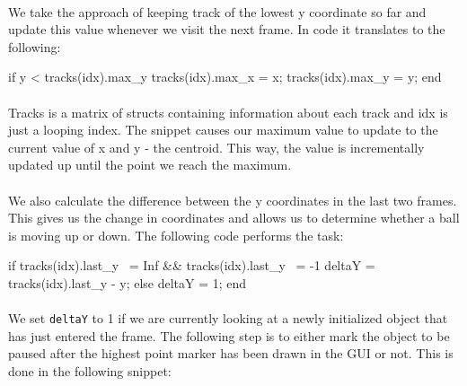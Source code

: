 \documentclass[10pt,a4paper]{article}
\begin{document}
\paragraph{} We take the approach of keeping track of the lowest y coordinate so far and update this value whenever we visit the next frame. In code it translates to the following:

\begin{samepage}
\begin{verbatimtab}
	if y < tracks(idx).max_y
		tracks(idx).max_x = x;
		tracks(idx).max_y = y;
	end
\end{verbatimtab}
\end{samepage}

\paragraph{} Tracks is a matrix of structs containing information about each track and idx is just a looping index. The snippet causes our maximum value to update to the current value of x and y - the centroid. This way, the value is incrementally updated up until the point we reach the maximum.
\paragraph{} We also calculate the difference between the y coordinates in the last two frames. This gives us the change in coordinates and allows us to determine whether a ball is moving up or down. The following code performs the task:

\begin{samepage}
\begin{verbatimtab}
	if tracks(idx).last_y ~= Inf && tracks(idx).last_y ~= -1
		deltaY = tracks(idx).last_y - y;
	else
		deltaY = 1;
	end
\end{verbatimtab}
\end{samepage}

\paragraph{} We set \texttt{deltaY} to 1 if we are currently looking at a newly initialized object that has just entered the frame. The following step is to either mark the object to be paused after the highest point marker has been drawn in the GUI or not. This is done in the following snippet:
\end{document}
